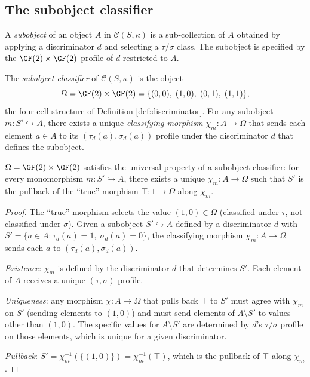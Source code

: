 \subsection{The subobject classifier}\label{sec:subobject}

\begin{definition}[Subobject]\label{def:subobject}
A \emph{subobject} of an object $A$ in
$\mathcal{C}(S,\kappa)$ is a sub-collection of $A$
obtained by applying a discriminator $d$ and selecting
a $\tau/\sigma$ class. The subobject is specified by
the $\GF(2) \times \GF(2)$ profile of $d$ restricted
to $A$.
\end{definition}

\begin{definition}\label{def:subobj-class}
The \emph{subobject classifier} of $\mathcal{C}(S,\kappa)$
is the object
\begin{equation}
  \Omega = \GF(2) \times \GF(2) = \{(0,0),\; (1,0),\;
  (0,1),\; (1,1)\},
\end{equation}
the four-cell structure of Definition \ref{def:discriminator}.
For any subobject $m: S' \hookrightarrow A$, there exists a
unique \emph{classifying morphism} $\chi_m: A \to \Omega$
that sends each element $a \in A$ to its $(\tau_d(a),
\sigma_d(a))$ profile under the discriminator $d$ that
defines the subobject.
\end{definition}

\begin{theorem}
\label{thm:subobj}
$\Omega = \GF(2) \times \GF(2)$ satisfies the universal
property of a subobject classifier: for every monomorphism
$m: S' \hookrightarrow A$, there exists a unique
$\chi_m: A \to \Omega$ such that $S'$ is the pullback of
the ``true'' morphism $\top: 1 \to \Omega$ along $\chi_m$.
\end{theorem}

\begin{proof}
The ``true'' morphism selects the value $(1,0) \in \Omega$
(classified under $\tau$, not classified under $\sigma$).
Given a subobject $S' \hookrightarrow A$ defined by a
discriminator $d$ with $S' = \{a \in A : \tau_d(a) = 1,\;
\sigma_d(a) = 0\}$, the classifying morphism
$\chi_m: A \to \Omega$ sends each $a$ to
$(\tau_d(a), \sigma_d(a))$.

\emph{Existence}: $\chi_m$ is defined by the discriminator
$d$ that determines $S'$. Each element of $A$ receives a
unique $(\tau, \sigma)$ profile.

\emph{Uniqueness}: any morphism $\chi: A \to \Omega$ that
pulls back $\top$ to $S'$ must agree with $\chi_m$ on
$S'$ (sending elements to $(1,0)$) and must send elements
of $A \setminus S'$ to values other than $(1,0)$. The
specific values for $A \setminus S'$ are determined by
$d$'s $\tau/\sigma$ profile on those elements, which is
unique for a given discriminator.

\emph{Pullback}: $S' = \chi_m^{-1}(\{(1,0)\}) = \chi_m^{-1}(\top)$,
which is the pullback of $\top$ along $\chi_m$.
\end{proof}

